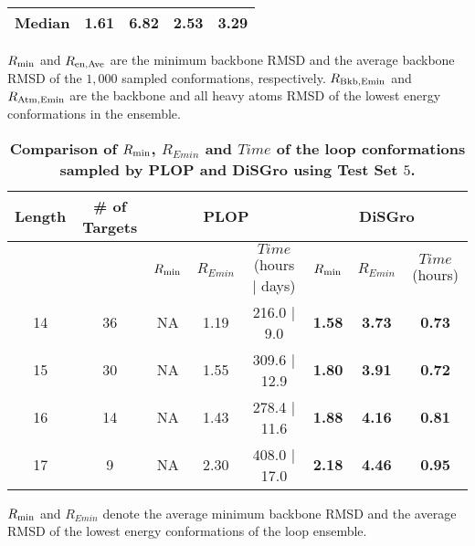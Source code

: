 \begin{table}[!h]
\begin{tabular}{|c|l|c|c|c|c|c|c|c|}
  \hline
  \multicolumn{5}{|c|}{Median} & \textbf{1.61} & \textbf{6.82} & \textbf{2.53} & \textbf{3.29}\\
  \hline
  \end{tabular}
  \begin{flushleft}$R_{\rm min}$ and $R_{\rm en,Ave}$ are the minimum backbone RMSD and
  the average backbone RMSD of the $1,000$ sampled conformations, respectively. $R_{\rm Bkb,Emin}$ and $R_{\rm Atm,Emin}$ are the backbone and all heavy atoms RMSD of the lowest energy conformations in the ensemble.
\end{flushleft}
\label{tab:fiser13}
\end{table}
\begin{table}[!h]
\caption{ \bf{Comparison of $R_{\rm min}$, $R_{Emin}$ and $Time$ of
the loop conformations sampled by PLOP and {\sc DiSGro} using Test
Set $5$.}}
\begin{tabular}{|c|c| c c c| c c c |}
\hline \cline{3-5} \cline{6-8}
Length &  \# of Targets & \multicolumn{3}{c|}{PLOP} & \multicolumn{3}{c|}{{\sc DiSGro}} \\
\hline
    & & $R_{\rm min}$ & $R_{Emin}$ & $Time$ (hours $\mid$ days) & $R_{\rm min}$ & $R_{Emin}$ & $Time$ (hours)\\
\hline
    14 & 36 & NA & 1.19 & 216.0 $\mid$ 9.0 &\textbf{1.58} & \textbf{3.73} & \textbf{0.73}\\
    15 & 30 & NA & 1.55 & 309.6 $\mid$ 12.9 &\textbf{1.80} & \textbf{3.91} & \textbf{0.72}\\
    16 & 14 & NA & 1.43 & 278.4 $\mid$ 11.6 &\textbf{1.88} & \textbf{4.16} & \textbf{0.81}\\
    17 &  9 & NA & 2.30 & 408.0 $\mid$ 17.0 &\textbf{2.18} & \textbf{4.46} & \textbf{0.95}\\
\hline
\end{tabular}
\begin{flushleft}$R_{\rm min}$ and $R_{Emin}$ denote the
average minimum backbone RMSD and the average RMSD of the lowest
energy conformations of the loop ensemble.
\end{flushleft}
\label{tab:zhaoplop}
\end{table}

